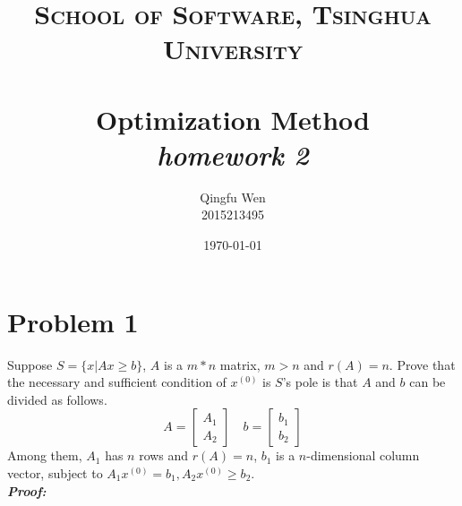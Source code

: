\documentclass[paper=a4, fontsize=11pt]{scrartcl} %
\title{	
\normalfont \normalsize
\textsc{School of Software, Tsinghua University} \\ [25pt] %
\horrule{0.5pt} \\[0.4cm] %
\huge Optimization Method\\ %
\LARGE\textit{homework 2}
\horrule{2pt} \\[0.5cm] %
}
\author{Qingfu Wen \\ \normalsize 2015213495} %
\date{\normalsize\today} %
\numberwithin{equation}{section} %
\numberwithin{figure}{section} %
\numberwithin{table}{section} %
\begin{document}
\maketitle %
\tableofcontents
\newpage

\section{Problem 1}
Suppose $S = \{x|Ax\geq b\}$, $A$ is a $m*n$ matrix, $m > n$ and $r(A)=n$. Prove that the necessary and sufficient condition of $x^{(0)}$ is $S$'s pole is that $A$ and $b$ can be divided as follows.
\begin{equation}  \nonumber
A = \begin{bmatrix} A_1 \\  A_2 \end{bmatrix}\quad
b = \begin{bmatrix} b_1 \\ b_2 \end{bmatrix}
\end{equation}
Among them, $A_1$ has $n$ rows and $r(A)=n$, $b_1$ is a $n$-dimensional column vector, subject to $A_1x^{(0)}=b_1, A_2x^{(0)}\geq b_2$. \\
\emph{\textbf{Proof:}}\\
\end{document}
